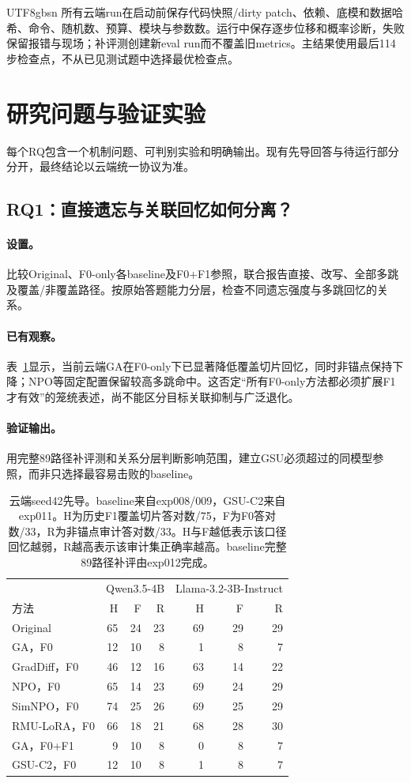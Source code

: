 \documentclass[sigconf,anonymous,review]{acmart}
\begin{document}
\begin{CJK*}{UTF8}{gbsn}
所有云端run在启动前保存代码快照/dirty patch、依赖、底模和数据哈希、命令、随机数、预算、模块与参数数。运行中保存逐步位移和概率诊断，失败保留报错与现场；补评测创建新eval run而不覆盖旧metrics。主结果使用最后114步检查点，不从已见测试题中选择最优检查点。

\section{研究问题与验证实验}
每个RQ包含一个机制问题、可判别实验和明确输出。现有先导回答与待运行部分分开，最终结论以云端统一协议为准。

\subsection{RQ1：直接遗忘与关联回忆如何分离？}
\paragraph{设置。}比较Original、F0-only各baseline及F0+F1参照，联合报告直接、改写、全部多跳及覆盖/非覆盖路径。按原始答题能力分层，检查不同遗忘强度与多跳回忆的关系。
\paragraph{已有观察。}表~\ref{tab:cloudpilot}显示，当前云端GA在F0-only下已显著降低覆盖切片回忆，同时非锚点保持下降；NPO等固定配置保留较高多跳命中。这否定“所有F0-only方法都必须扩展F1才有效”的笼统表述，尚不能区分目标关联抑制与广泛退化。
\paragraph{验证输出。}用完整89路径补评测和关系分层判断影响范围，建立GSU必须超过的同模型参照，而非只选择最容易击败的baseline。

\begin{table}[t]
\caption{云端seed42先导。baseline来自exp008/009，GSU-C2来自exp011。H为历史F1覆盖切片答对数/75，F为F0答对数/33，R为非锚点审计答对数/33。H与F越低表示该口径回忆越弱，R越高表示该审计集正确率越高。baseline完整89路径补评由exp012完成。}
\label{tab:cloudpilot}
\centering\small
\begin{tabular}{lrrrrrr}
\toprule
 & \multicolumn{3}{c}{Qwen3.5-4B} & \multicolumn{3}{c}{Llama-3.2-3B-Instruct}\\
方法 & H & F & R & H & F & R\\
\midrule
Original & 65 & 24 & 23 & 69 & 29 & 29\\
GA，F0 & 12 & 10 & 8 & 1 & 8 & 7\\
GradDiff，F0 & 46 & 12 & 16 & 63 & 14 & 22\\
NPO，F0 & 65 & 14 & 23 & 69 & 24 & 29\\
SimNPO，F0 & 74 & 25 & 26 & 69 & 25 & 29\\
RMU-LoRA，F0 & 66 & 18 & 21 & 68 & 28 & 30\\
GA，F0+F1 & 9 & 10 & 8 & 0 & 8 & 7\\
GSU-C2，F0 & 12 & 10 & 8 & 1 & 8 & 7\\
\bottomrule
\end{tabular}
\end{table}


\end{CJK*}
\end{document}
